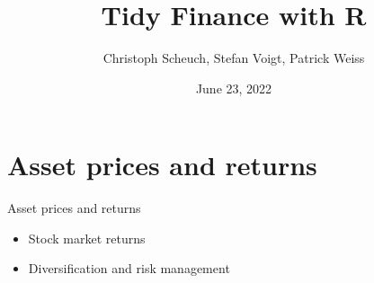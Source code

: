 \documentclass[
  11pt,
  ignorenonframetext,
  compress]{beamer}
\title{Tidy Finance with R}
\author{Christoph Scheuch, Stefan Voigt, Patrick Weiss}
\date{June 23, 2022}
\providecommand{\tightlist}{%
  \setlength{\itemsep}{0pt}\setlength{\parskip}{0pt}}
\begin{document}
\frame{\titlepage}

\hypertarget{asset-prices-and-returns}{%
\section{Asset prices and returns}\label{asset-prices-and-returns}}

\begin{frame}{Asset prices and returns}
\protect\hypertarget{asset-prices-and-returns-1}{}
\begin{itemize}
\tightlist
\item
  Stock market returns
\item
  Diversification and risk management
\end{itemize}
\end{frame}
\end{document}
